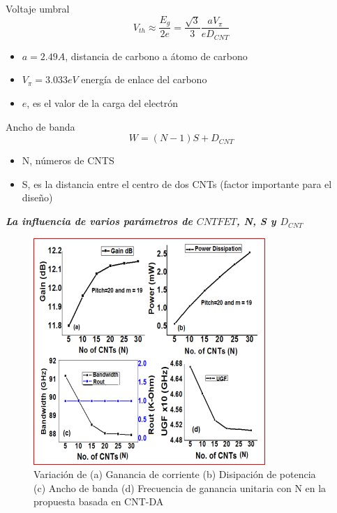 \documentclass[conference]{IEEEtran} %
\begin{document}
Voltaje umbral
		\begin{equation}
			V_{th}\approx \frac{E_g}{2e} = \frac{\sqrt{3}}{3}\frac{a V_{\pi}}{eD_{CNT}}
		\end{equation}
		\begin{itemize}
			\item $a= 2.49A$, distancia de carbono a átomo de carbono
			\item $V_{\pi} = 3.033eV$ energía de enlace del carbono
			\item $e$, es el valor de la carga del electrón
		\end{itemize}

	




Ancho de banda
		\begin{equation}
			W = (N-1)S+D_{CNT}
		\end{equation}
		\begin{itemize}
			\item N, números de CNTS
			\item S, es la distancia entre el centro de dos CNTs (factor importante para el diseño)
		\end{itemize}
		\textbf{\textit{La influencia de varios parámetros de $CNTFET$, N, S y $D_{CNT}$}}

	\begin{figure}[!h] 
		\centering
		\includegraphics[scale=0.5]{IMAGENES/4.PNG}
		\caption{Variación de (a) Ganancia de corriente (b) Disipación de potencia (c) Ancho de banda (d) Frecuencia de ganancia unitaria con N en la propuesta basada en CNT-DA\cite{Akhoon}}
	\end{figure}
\end{document}
